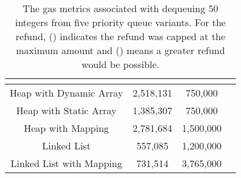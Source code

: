 

\begin{table}[t]
\setlength{\tabcolsep}{0.2\tabcolsep}%
\centering
\begin{tabular}{|c|c|c|l|}

\multicolumn{1}{c}{} & \headrow{Gas Costs (\texttt{gasUsed})} & \headrow{Refund (Manual)} & \headrow{Full Refund?} \\ \hline

Heap with Dynamic Array       	& 2,518,131          & 750,000     &\full                  \\ \hline
Heap with Static Array          	& 1,385,307                             & 750,000      &\full                \\ \hline
Heap with Mapping 			& 2,781,684                            & 1,500,000    &\full                 \\ \hline
Linked List                     		& 557,085               	           & 1,200,000      &\full                \\ \hline
Linked List with Mapping      	& 731,514              	     	  &  3,765,000      &\full                 \\ \hline

\end{tabular}
\caption{The gas metrics associated with dequeuing 50 integers from five priority queue variants. For the refund, (\full) indicates the  refund was capped at the maximum amount and (\prt) means a greater refund would be possible.
\label{tab:PQUnitTests}}
\end{table}


